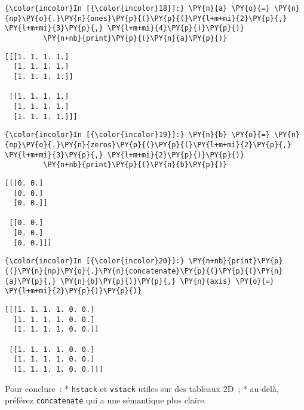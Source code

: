     \begin{Verbatim}[commandchars=\\\{\}]
{\color{incolor}In [{\color{incolor}18}]:} \PY{n}{a} \PY{o}{=} \PY{n}{np}\PY{o}{.}\PY{n}{ones}\PY{p}{(}\PY{p}{(}\PY{l+m+mi}{2}\PY{p}{,} \PY{l+m+mi}{3}\PY{p}{,} \PY{l+m+mi}{4}\PY{p}{)}\PY{p}{)}
         \PY{n+nb}{print}\PY{p}{(}\PY{n}{a}\PY{p}{)}
\end{Verbatim}


    \begin{Verbatim}[commandchars=\\\{\}]
[[[1. 1. 1. 1.]
  [1. 1. 1. 1.]
  [1. 1. 1. 1.]]

 [[1. 1. 1. 1.]
  [1. 1. 1. 1.]
  [1. 1. 1. 1.]]]

    \end{Verbatim}

    \begin{Verbatim}[commandchars=\\\{\}]
{\color{incolor}In [{\color{incolor}19}]:} \PY{n}{b} \PY{o}{=} \PY{n}{np}\PY{o}{.}\PY{n}{zeros}\PY{p}{(}\PY{p}{(}\PY{l+m+mi}{2}\PY{p}{,} \PY{l+m+mi}{3}\PY{p}{,} \PY{l+m+mi}{2}\PY{p}{)}\PY{p}{)}
         \PY{n+nb}{print}\PY{p}{(}\PY{n}{b}\PY{p}{)}
\end{Verbatim}


    \begin{Verbatim}[commandchars=\\\{\}]
[[[0. 0.]
  [0. 0.]
  [0. 0.]]

 [[0. 0.]
  [0. 0.]
  [0. 0.]]]

    \end{Verbatim}

    \begin{Verbatim}[commandchars=\\\{\}]
{\color{incolor}In [{\color{incolor}20}]:} \PY{n+nb}{print}\PY{p}{(}\PY{n}{np}\PY{o}{.}\PY{n}{concatenate}\PY{p}{(}\PY{p}{(}\PY{n}{a}\PY{p}{,} \PY{n}{b}\PY{p}{)}\PY{p}{,} \PY{n}{axis} \PY{o}{=} \PY{l+m+mi}{2}\PY{p}{)}\PY{p}{)}
\end{Verbatim}


    \begin{Verbatim}[commandchars=\\\{\}]
[[[1. 1. 1. 1. 0. 0.]
  [1. 1. 1. 1. 0. 0.]
  [1. 1. 1. 1. 0. 0.]]

 [[1. 1. 1. 1. 0. 0.]
  [1. 1. 1. 1. 0. 0.]
  [1. 1. 1. 1. 0. 0.]]]

    \end{Verbatim}

    Pour conclure~: * \texttt{hstack} et \texttt{vstack} utiles sur des
tableaux 2D~; * au-delà, préférez \texttt{concatenate} qui a une
sémantique plus claire.

